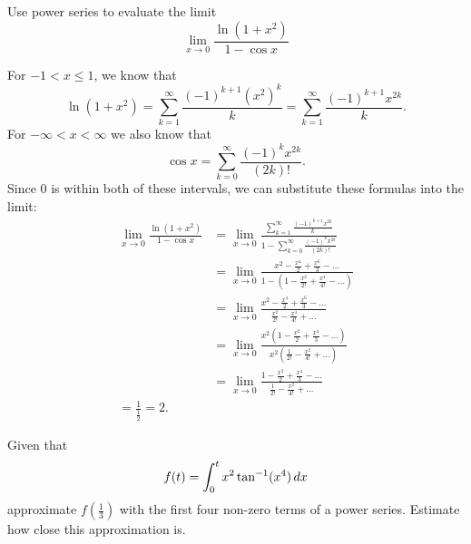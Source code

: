 \documentclass[]{ximera}
\begin{document}
\begin{problem}
Use power series to evaluate the limit
	\[
	\lim_{x \to 0} \frac{\ln (1+x^2)}{1 - \cos x}
	\]
	
	\begin{freeResponse}
	For $-1 < x \leq 1$, we know that
		\[
		\ln(1+x^2) = \sum_{k=1}^\infty \frac{(-1)^{k+1} (x^2)^k}{k} = \sum_{k=1}^\infty \frac{(-1)^{k+1} x^{2k}}{k}.
		\]
	For $- \infty < x < \infty$ we also know that
		\[
		\cos x = \sum_{k=0}^\infty \frac{(-1)^k x^{2k}}{(2k)!}.
		\]
	Since $0$ is within both of these intervals, we can substitute these formulas into the limit:
		\begin{align*}
		\lim_{x \to 0} \frac{\ln (1+x^2)}{1 - \cos x}
		&= \lim_{x \to 0} \frac{\sum_{k=1}^\infty \frac{(-1)^{k+1} x^{2k}}{k}}{1 - \sum_{k=0}^\infty \frac{(-1)^k x^{2k}}{(2k)!}}  \\
		&= \lim_{x \to 0} \frac{x^2 - \frac{x^4}{2} + \frac{x^6}{3} - \hdots}{1 - \left( 1 - \frac{x^2}{2!} + \frac{x^4}{4!} - \hdots \right)}  \\
		&= \lim_{x \to 0} \frac{x^2 - \frac{x^4}{2} + \frac{x^6}{3} - \hdots}{\frac{x^2}{2!} - \frac{x^4}{4!} + \hdots}  \\
		&= \lim_{x \to 0} \frac{x^2 \left( 1 - \frac{x^2}{2} + \frac{x^4}{3} - \hdots \right) }{x^2 \left( \frac{1}{2!} - \frac{x^2}{4!} + \hdots \right)}  \\
		&= \lim_{x \to 0} \frac{1 - \frac{x^2}{2} + \frac{x^4}{3} - \hdots }{\frac{1}{2!} - \frac{x^2}{4!} + \hdots }  \\
		= \frac{1}{\frac{1}{2}} = \boxed{2}.
		\end{align*} 
		
	\end{freeResponse}
	
\end{problem}

\begin{instructorNotes}

\end{instructorNotes}







\begin{problem}
Given that
	\[
	f(t) = \int_0^t x^2 \tan^{-1}(x^4) \,d x
	\]
approximate $f \left( \frac{1}{3} \right)$ with the first four non-zero terms of a power series.  
Estimate how close this approximation is.
	
	\begin{freeResponse}
	
	\end{freeResponse}
		
\end{problem}
\end{document}
